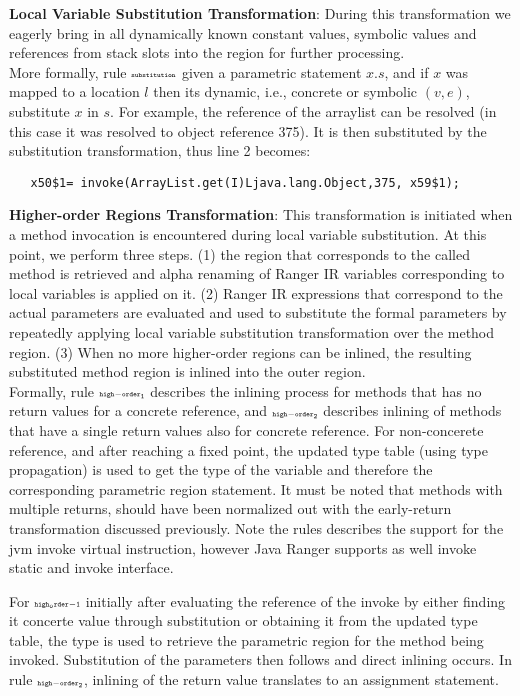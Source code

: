 %
\textbf{Local Variable Substitution Transformation}: During this transformation we eagerly bring in all dynamically
known constant values, symbolic values and references from stack slots into the region for further processing. \\
More formally, rule $\scriptscriptstyle\mathtt{substitution}$ given a parametric statement $x.s$, and if $x$ was mapped to a location $l$ then its dynamic, i.e., concrete or symbolic $(v, e)$, substitute $x$ in $s$. For example, the reference of the arraylist can be resolved (in this case it was resolved to object reference 375). It is then substituted by the substitution transformation, thus line 2 becomes:
\begin{lstlisting}
   x50$1= invoke(ArrayList.get(I)Ljava.lang.Object,375, x59$1);
\end{lstlisting}
%
\textbf{Higher-order Regions Transformation}: This transformation is initiated when a method invocation is encountered
during local variable substitution.
%
At this point, we perform three steps.
%
(1) the region that corresponds to the called method is retrieved and alpha renaming of
Ranger IR variables corresponding to local variables is applied on it.
%
(2) Ranger IR expressions that correspond to the actual parameters are evaluated and used to substitute the formal
parameters by repeatedly applying local variable substitution transformation over the method region.
%
(3) When no more higher-order regions can be inlined, the resulting substituted method region is inlined into
the outer region.\\
%
Formally, rule $\scriptscriptstyle\mathtt{high-order_1}$ describes the inlining process for methods that has no return values for a concrete reference, and $\scriptscriptstyle\mathtt{high-order_2}$ describes inlining of methods that have a single return values also for concrete reference. For non-concerete reference, and after reaching a fixed point, the updated type table (using type propagation) is used to get the type of the variable and therefore the corresponding parametric region statement. It must be noted that methods with multiple returns, should have been normalized out with the early-return transformation discussed previously. Note the rules describes the support for the jvm invoke virtual instruction, however Java Ranger supports as well invoke static and invoke interface. 

For $\scriptscriptstyle\mathtt{high_order-1}$ initially after evaluating the reference of the invoke by either finding it concerte value through substitution or obtaining it from the updated type table, the type is used to retrieve the parametric region for the method being invoked. Substitution of the parameters then follows and direct inlining occurs. In rule $\scriptscriptstyle\mathtt{high-order_2}$, inlining of the return value translates to an assignment statement.

